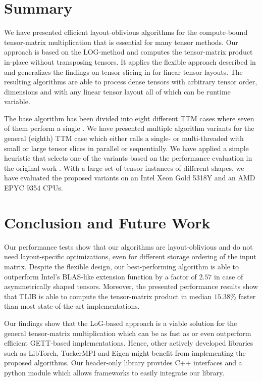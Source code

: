 \section{Summary}
\label{sec:summary}
We have presented efficient layout-oblivious algorithms for the compute-bound tensor-matrix multiplication that is essential for many tensor methods.
Our approach is based on the LOG-method and computes the tensor-matrix product in-place without transposing tensors.
It applies the flexible approach described in \cite{bassoy:2019:ttv} and generalizes the findings on tensor slicing in \cite{li:2015:input} for linear tensor layouts.
The resulting algorithms are able to process dense tensors with arbitrary tensor order, dimensions and with any linear tensor layout all of which can be runtime variable.

The base algorithm has been divided into eight different TTM cases where seven of them perform a single .
We have presented multiple algorithm variants for the general (eighth) TTM case which either calls a single- or multi-threaded  with small or large tensor slices in parallel or sequentially.
We have applied a simple heuristic that selects one of the variants based on the performance evaluation in the original work \cite{bassoy:2024:ttm}.
With a large set of tensor instances of different shapes, we have evaluated the proposed variants on an Intel Xeon Gold 5318Y and an AMD EPYC 9354 CPUs.

\section{Conclusion and Future Work}
\label{sec:conclusion}
Our performance tests show that our algorithms are layout-oblivious and do not need layout-specific optimizations, even for different storage ordering of the input matrix.
Despite the flexible design, our best-performing algorithm is able to outperform Intel's BLAS-like extension function  by a factor of $2.57$ in case of asymmetrically shaped tensors.
Moreover, the presented performance results show that TLIB is able to compute the tensor-matrix product in median $15.38$\% faster than most state-of-the-art implementations.

Our findings show that the LoG-based approach is a viable solution for the general tensor-matrix multiplication which can be as fast as or even outperform efficient GETT-based implementations.
Hence, other actively developed libraries such as LibTorch, TuckerMPI and Eigen might benefit from implementing the proposed algorithms.
Our header-only library provides C++ interfaces and a python module which allows frameworks to easily integrate our library.

